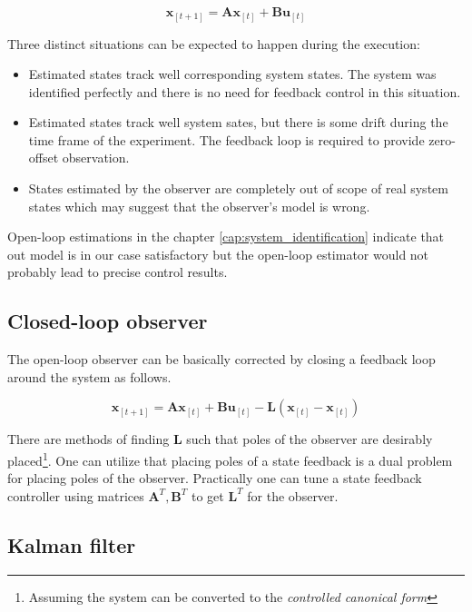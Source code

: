 \begin{equation}
\textbf{\^x}_{[t+1]} = \textbf{A}\textbf{\^x}_{[t]} + \textbf{B}\textbf{u}_{[t]}
\end{equation}

Three distinct situations can be expected to happen during the execution:

\begin{itemize}
\item Estimated states track well corresponding system states. The system was identified perfectly and there is no need for feedback control in this situation.
\item Estimated states track well system sates, but there is some drift during the time frame of the experiment. The feedback loop is required to provide zero-offset observation.
\item States estimated by the observer are completely out of scope of real system states which may suggest that the observer's model is wrong.
\end{itemize}

Open-loop estimations in the chapter \ref{cap:system_identification} indicate that out model is in our case satisfactory but the open-loop estimator would not probably lead to precise control results.

\subsection{Closed-loop observer}

The open-loop observer can be basically corrected by closing a feedback loop around the system as follows.

\begin{equation}
\textbf{\^x}_{[t+1]} = \textbf{A}\textbf{\^x}_{[t]} + \textbf{B}\textbf{u}_{[t]} - \textbf{L}\left(\textbf{x}_{[t]} - \textbf{\^x}_{[t]}\right)
\label{eq:closed_loop_observer}
\end{equation}

There are methods of finding $\textbf{L}$ such that poles of the observer are desirably placed\footnote{Assuming the system can be converted to the \textit{controlled canonical form}}. One can utilize that placing poles of a state feedback is a dual problem for placing poles of the observer. Practically one can tune a state feedback controller using matrices $\textbf{A}^T, \textbf{B}^T$ to get $\textbf{L}^T$ for the observer.

\subsection{Kalman filter}

